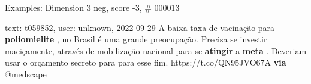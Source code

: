 \begin{frame}{Examples: Dimension 3 neg, score -3, \# 000013}
\footnotesize
\begin{alertblock}{text: t059852, user: unknown, 2022-09-29}
A baixa taxa de vacinação para \textbf{poliomielite} , no Brasil é uma grande 
preocupação. Precisa se investir maciçamente, através de mobilização nacional 
para se \textbf{atingir} a \textbf{meta} . Deveriam usar o orçamento secreto 
para para esse fim. https://t.co/QN95JVO67A \textbf{via} @medscape 
\end{alertblock}
\end{frame}
